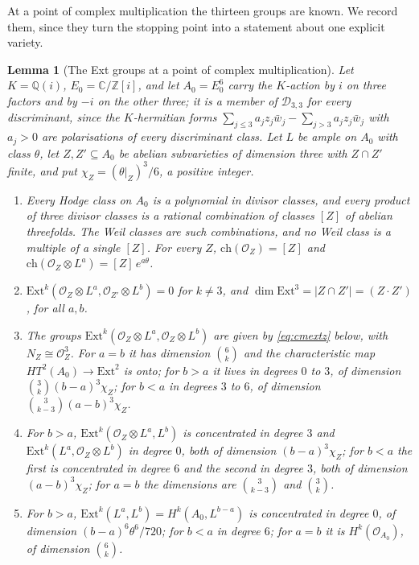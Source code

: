 \documentclass[11pt,reqno]{amsart}
\numberwithin{equation}{section}
\theoremstyle{plain}
\newtheorem{lemma}[theorem]{Lemma}
\theoremstyle{definition}
\newcommand{\QQ}{\mathbb{Q}}
\newcommand{\ZZ}{\mathbb{Z}}
\newcommand{\CC}{\mathbb{C}}
\newcommand{\Ext}{\mathrm{Ext}}
\newcommand{\ch}{\mathrm{ch}}
\newcommand{\cD}{\mathcal{D}}
\begin{document}
At a point of complex multiplication the thirteen groups are known. We record them, since they turn the stopping point into a statement about one explicit variety.

\begin{lemma}[The Ext groups at a point of complex multiplication]\label{lem:cmext}
Let $K=\QQ(i)$, $E_{0}=\CC/\ZZ[i]$, and let $A_{0}=E_{0}^{6}$ carry the $K$-action by $i$ on three factors and by $-i$ on the other three; it is a member of $\cD_{3,3}$ for every discriminant, since the $K$-hermitian forms $\sum_{j\le3}a_{j}z_{j}\bar w_{j}-\sum_{j>3}a_{j}z_{j}\bar w_{j}$ with $a_{j}>0$ are polarisations of every discriminant class. Let $L$ be ample on $A_{0}$ with class $\theta$, let $Z,Z'\subseteq A_{0}$ be abelian subvarieties of dimension three with $Z\cap Z'$ finite, and put $\chi_{Z}=(\theta|_{Z})^{3}/6$, a positive integer.
\begin{enumerate}[label=\textup{(\roman*)},leftmargin=2.4em,itemsep=2pt]
\item Every Hodge class on $A_{0}$ is a polynomial in divisor classes, and every product of three divisor classes is a rational combination of classes $[Z]$ of abelian threefolds. The Weil classes are such combinations, and no Weil class is a multiple of a single $[Z]$. For every $Z$, $\ch(\mathcal{O}_{Z})=[Z]$ and $\ch(\mathcal{O}_{Z}\otimes L^{a})=[Z]\,e^{a\theta}$.
\item $\Ext^{k}(\mathcal{O}_{Z}\otimes L^{a},\mathcal{O}_{Z'}\otimes L^{b})=0$ for $k\ne3$, and $\dim\Ext^{3}=|Z\cap Z'|=(Z\cdot Z')$, for all $a,b$.
\item The groups $\Ext^{k}(\mathcal{O}_{Z}\otimes L^{a},\mathcal{O}_{Z}\otimes L^{b})$ are given by \eqref{eq:cmextz} below, with $N_{Z}\cong\mathcal{O}_{Z}^{3}$. For $a=b$ it has dimension $\binom{6}{k}$ and the characteristic map $HT^{2}(A_{0})\to\Ext^{2}$ is onto; for $b>a$ it lives in degrees $0$ to $3$, of dimension $\binom{3}{k}(b-a)^{3}\chi_{Z}$; for $b<a$ in degrees $3$ to $6$, of dimension $\binom{3}{k-3}(a-b)^{3}\chi_{Z}$.
\item For $b>a$, $\Ext^{k}(\mathcal{O}_{Z}\otimes L^{a},L^{b})$ is concentrated in degree $3$ and $\Ext^{k}(L^{a},\mathcal{O}_{Z}\otimes L^{b})$ in degree $0$, both of dimension $(b-a)^{3}\chi_{Z}$; for $b<a$ the first is concentrated in degree $6$ and the second in degree $3$, both of dimension $(a-b)^{3}\chi_{Z}$; for $a=b$ the dimensions are $\binom{3}{k-3}$ and $\binom{3}{k}$.
\item For $b>a$, $\Ext^{k}(L^{a},L^{b})=H^{k}(A_{0},L^{b-a})$ is concentrated in degree $0$, of dimension $(b-a)^{6}\theta^{6}/720$; for $b<a$ in degree $6$; for $a=b$ it is $H^{k}(\mathcal{O}_{A_{0}})$, of dimension $\binom{6}{k}$.
\end{enumerate}
\end{lemma}
\end{document}
